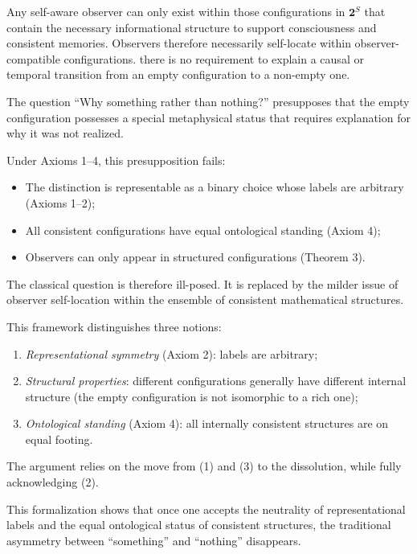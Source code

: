 \documentclass[11pt]{article}
\begin{document}
\begin{theorem}
Any self-aware observer can only exist within those configurations in $\mathbf{2}^S$ that contain the necessary informational structure to support consciousness and consistent memories. Observers therefore necessarily self-locate within observer-compatible configurations. there is no requirement to explain a causal or temporal transition from an empty configuration to a non-empty one.
\end{theorem}

\begin{corollary}
The question ``Why something rather than nothing?'' presupposes that the empty configuration possesses a special metaphysical status that requires explanation for why it was not realized.  

Under Axioms 1--4, this presupposition fails:  
\begin{itemize}
    \item The distinction is representable as a binary choice whose labels are arbitrary (Axioms 1--2);
    \item All consistent configurations have equal ontological standing (Axiom 4);
    \item Observers can only appear in structured configurations (Theorem 3).
\end{itemize}
The classical question is therefore ill-posed. It is replaced by the milder issue of observer self-location within the ensemble of consistent mathematical structures.
\end{corollary}

\begin{remark}
This framework distinguishes three notions:
\begin{enumerate}
    \item \emph{Representational symmetry} (Axiom 2): labels are arbitrary;
    \item \emph{Structural properties}: different configurations generally have different internal structure (the empty configuration is not isomorphic to a rich one);
    \item \emph{Ontological standing} (Axiom 4): all internally consistent structures are on equal footing.
\end{enumerate}
The argument relies on the move from (1) and (3) to the dissolution, while fully acknowledging (2).
\end{remark}

This formalization shows that once one accepts the neutrality of representational labels and the equal ontological status of consistent structures, the traditional asymmetry between ``something'' and ``nothing'' disappears.
\end{document}
